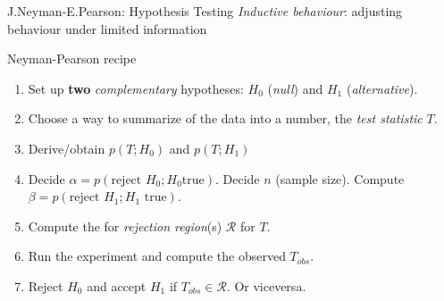 \documentclass[aspectratio=169]{beamer}
\begin{document}
\begin{frame}{J.Neyman-E.Pearson: Hypothesis Testing}
  \emph{Inductive behaviour}: adjusting behaviour under limited
  information %
  \begin{block}{Neyman-Pearson recipe}
    \begin{enumerate}
    \item Set up \textbf{two} %
      \emph{complementary} hypotheses: $H_0$
      (\emph{null}) and $H_1$ (\emph{alternative}).
    \item Choose a way to summarize of the data into a number, the
      \emph{test statistic} $T$.
    \item Derive/obtain $p(T;H_0)$ and $p(T;H_1)$ %
    \item Decide $\alpha = p(\text{reject } H_0; H_0 \text{
        true})$. Decide $n$ (sample size). Compute
      $\beta = p(\text{reject } H_1; H_1 \text{ true})$.
    \item Compute the for \emph{rejection region}(s) $\mathcal{R}$ for $T$.
    \item Run the experiment and compute the observed $T_{obs}$.
    \item Reject $H_0$ and accept $H_1$ if $T_{obs} \in
      \mathcal{R}$. Or viceversa.
    \end{enumerate}
  \end{block}
\end{frame}
\end{document}

